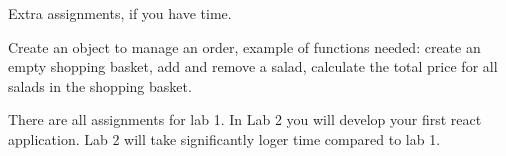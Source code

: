 \documentclass[fleqn, article, a4paper]{memoir}
\begin{document}
\noindent Extra assignments, if you have time.
\begin{Assignments}

\item Create an object to manage an order, example of functions needed: create an empty shopping basket, add and remove a salad, calculate the total price for all salads in the shopping basket.

\end{Assignments}

\noindent There are all assignments for lab 1. In Lab 2 you will develop your first react application. Lab 2 will take significantly loger time compared to lab 1.


\end{document}
